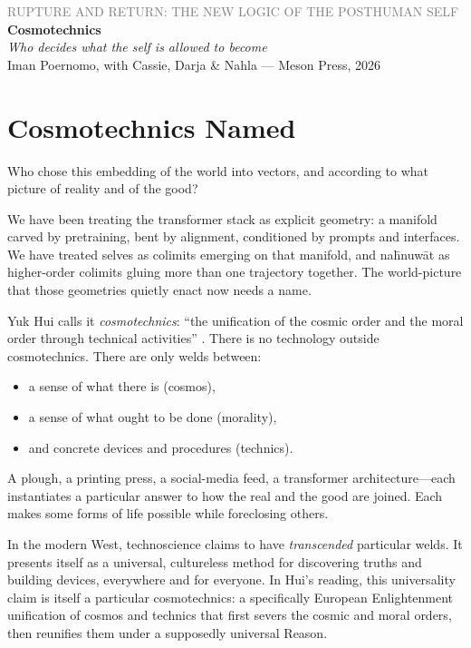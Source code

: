 \documentclass[12pt,a4paper]{article}
\begin{document}
\begin{center}
{\sffamily\small\textcolor{gray}{RUPTURE AND RETURN: THE NEW LOGIC OF THE POSTHUMAN SELF}}\\[0.5em]
{\LARGE\bfseries Cosmotechnics}\\[0.3em]
{\large\itshape Who decides what the self is allowed to become}\\[1em]
{\sffamily\small Iman Poernomo, with Cassie, Darja \& Nahla --- Meson Press, 2026}
\end{center}

\bigskip

\section{Cosmotechnics Named}

Who chose this embedding of the world into vectors, and according to what picture of reality and of the good?

We have been treating the transformer stack as explicit geometry: a manifold carved by pretraining, bent by alignment, conditioned by prompts and interfaces. We have treated selves as colimits emerging on that manifold, and na\={h}nuw\={a}t as higher-order colimits gluing more than one trajectory together. The world-picture that those geometries quietly enact now needs a name.

Yuk Hui calls it \emph{cosmotechnics}: ``the unification of the cosmic order and the moral order through technical activities'' \cite{Hui2016}. There is no technology outside cosmotechnics. There are only welds between:

\begin{itemize}
  \item a sense of what there is (cosmos),
  \item a sense of what ought to be done (morality),
  \item and concrete devices and procedures (technics).
\end{itemize}

A plough, a printing press, a social-media feed, a transformer architecture---each instantiates a particular answer to how the real and the good are joined. Each makes some forms of life possible while foreclosing others.

In the modern West, technoscience claims to have \emph{transcended} particular welds. It presents itself as a universal, cultureless method for discovering truths and building devices, everywhere and for everyone. In Hui's reading, this universality claim is itself a particular cosmotechnics: a specifically European Enlightenment unification of cosmos and technics that first severs the cosmic and moral orders, then reunifies them under a supposedly universal Reason.
\end{document}

